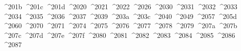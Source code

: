 {  ^^^^201b%
  ^^^^201c%
  ^^^^201d%
  ^^^^2020%
  ^^^^2021%
  ^^^^2022%
  ^^^^2026%
  ^^^^2030%
  ^^^^2031%
  ^^^^2032%
  ^^^^2033%
  ^^^^2034%
  ^^^^2035%
  ^^^^2036%
  ^^^^2037%
  ^^^^2039%
  ^^^^203a%
  ^^^^203c%
  ^^^^2040%
  ^^^^2049%
  ^^^^2057%
  ^^^^205d%
  ^^^^2060%
  ^^^^2070%
  ^^^^2071%
  ^^^^2074%
  ^^^^2075%
  ^^^^2076%
  ^^^^2077%
  ^^^^2078%
  ^^^^2079%
  ^^^^207a%
  ^^^^207b%
  ^^^^207c%
  ^^^^207d%
  ^^^^207e%
  ^^^^207f%
  ^^^^2080%
  ^^^^2081%
  ^^^^2082%
  ^^^^2083%
  ^^^^2084%
  ^^^^2085%
  ^^^^2086%
  ^^^^2087%
}
